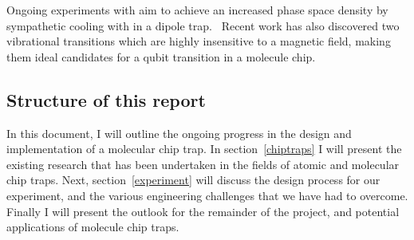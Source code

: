 Ongoing experiments with \CaF{} aim to achieve an increased phase space density by
sympathetic cooling with \esRb{} in a dipole trap.~ Recent
work has also discovered two vibrational transitions which are highly
insensitive to a magnetic field, making them ideal candidates for a qubit
transition in a molecule chip.

\subsection{Structure of this report}


In this document, I will outline the ongoing progress in the design and
implementation of a molecular chip trap. In section~\ref{chiptraps} I will present
the existing research that has been undertaken in the fields of atomic and
molecular chip traps. Next, section~\ref{experiment} will discuss the design
process for our experiment, and the various engineering challenges that we have
had to overcome. Finally I will present the outlook for the remainder of the
project, and potential applications of molecule chip traps.

